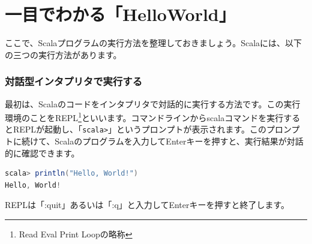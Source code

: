 \begin{table}[htb]
  \caption{EclipseユーザーのためのIntelliJ IDEAショートカット一覧}
  \label{tb:intellij_shortcuts}
  \begin{center}
  \end{center}
  \label{tb:table1}
\end{table}


\part{一目でわかる「HelloWorld」}
ここで、Scalaプログラムの実行方法を整理しておきましょう。Scalaには、以下の三つの実行方法があります。 

\section{対話型インタプリタで実行する}
最初は、Scalaのコードをインタプリタで対話的に実行する方法です。この実行環境のことをREPL\footnote{Read Eval Print Loopの略称}といいます。コマンドラインからscalaコマンドを実行するとREPLが起動し、「\verb|scala>|」というプロンプトが表示されます。このプロンプトに続けて、Scalaのプログラムを入力してEnterキーを押すと、実行結果が対話的に確認できます。 
\begin{lstlisting}[language=scala, frame=none]
scala> println("Hello, World!")
Hello, World!
\end{lstlisting}
REPLは「:quit」あるいは「:q」と入力してEnterキーを押すと終了します。 \\

